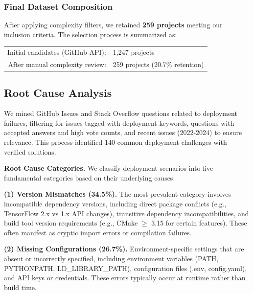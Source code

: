 \subsubsection{Final Dataset Composition}

After applying complexity filters, we retained \textbf{259 projects} meeting our inclusion criteria. The selection process is summarized as:

\begin{center}
\begin{tabular}{rl}
Initial candidates (GitHub API): & 1,247 projects \\
After manual complexity review: & 259 projects (20.7\% retention) \\

\end{tabular}
\end{center}


\subsection{Root Cause Analysis}\label{sec:root}

We mined GitHub Issues and Stack Overflow questions related to deployment failures, filtering for issues tagged with deployment keywords, questions with accepted answers and high vote counts, and recent issues (2022-2024) to ensure relevance. This process identified 140 common deployment challenges with verified solutions.



\textbf{Root Cause Categories.} We classify deployment scenarios into five fundamental categories based on their underlying causes:

\textbf{(1) Version Mismatches (34.5\%).} The most prevalent category involves incompatible dependency versions, including direct package conflicts (e.g., TensorFlow 2.x vs 1.x API changes), transitive dependency incompatibilities, and build tool version requirements (e.g., CMake $\geq$ 3.15 for certain features). These often manifest as cryptic import errors or compilation failures.

\textbf{(2) Missing Configurations (26.7\%).} Environment-specific settings that are absent or incorrectly specified, including environment variables (PATH, PYTHONPATH, LD\_LIBRARY\_PATH), configuration files (.env, config.yaml), and API keys or credentials. These errors typically occur at runtime rather than build time.

